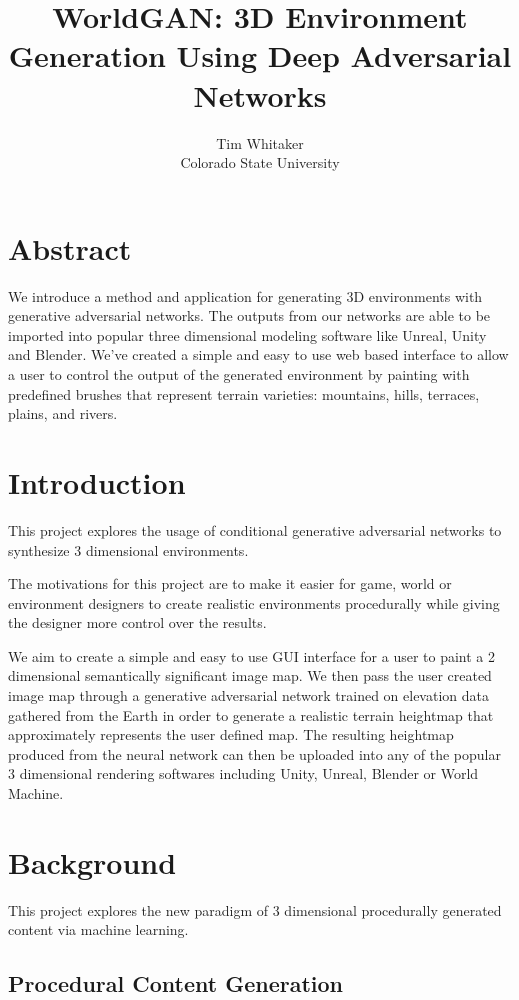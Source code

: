 \documentclass[twocolumn]{article}
\title{WorldGAN: 3D Environment Generation Using Deep Adversarial Networks}
\author{Tim Whitaker \\ Colorado State University}
\begin{document}
	\maketitle
	
	\section{Abstract}
	
	We introduce a method and application for generating 3D environments with generative adversarial networks. The outputs from our networks are able to be imported into popular three dimensional modeling software like Unreal, Unity and Blender. We've created a simple and easy to use web based interface to allow a user to control the output of the generated environment by painting with predefined brushes that represent terrain varieties: mountains, hills, terraces, plains, and rivers.
	
	\section{Introduction}

	This project explores the usage of conditional generative adversarial networks to synthesize 3 dimensional environments.
	
	The motivations for this project are to make it easier for game, world or environment designers to create realistic environments procedurally while giving the designer more control over the results.
	
	We aim to create a simple and easy to use GUI interface for a user to paint a 2 dimensional semantically significant image map. We then pass the user created image map through a generative adversarial network trained on elevation data gathered from the Earth in order to generate a realistic terrain heightmap that approximately represents the user defined map. The resulting heightmap produced from the neural network can then be uploaded into any of the popular 3 dimensional rendering softwares including Unity, Unreal, Blender or World Machine.
	
	\section{Background}
	
	This project explores the new paradigm of 3 dimensional procedurally generated content via machine learning.
		
	\subsection{Procedural Content Generation}
	
\end{document}
